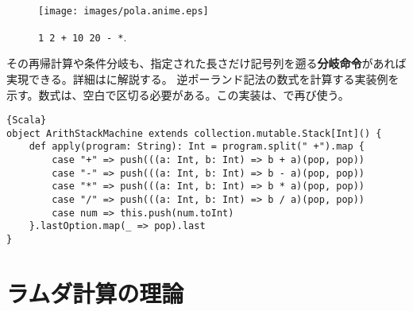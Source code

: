 \documentclass[10pt,a4paper]{book}
\begin{document}
\begin{figure}[h]
\centering
\texttt{[image: images/pola.anime.eps]}
\caption{\texttt{1 2 + 10 20 - *}.\label{fig:math}}
\end{figure}

その再帰計算や条件分岐も、指定された長さだけ記号列を遡る\textbf{分岐命令}があれば実現できる。詳細はに解説する。
逆ポーランド記法の数式を計算する実装例を示す。数式は、空白で区切る必要がある。この実装は、で再び使う。

\begin{Verbatim}{Scala}
object ArithStackMachine extends collection.mutable.Stack[Int]() {
	def apply(program: String): Int = program.split(" +").map {
		case "+" => push(((a: Int, b: Int) => b + a)(pop, pop))
		case "-" => push(((a: Int, b: Int) => b - a)(pop, pop))
		case "*" => push(((a: Int, b: Int) => b * a)(pop, pop))
		case "/" => push(((a: Int, b: Int) => b / a)(pop, pop))
		case num => this.push(num.toInt)
	}.lastOption.map(_ => pop).last
}
\end{Verbatim}

\chapter{ラムダ計算の理論\label{chap:lambda}}
\end{document}
